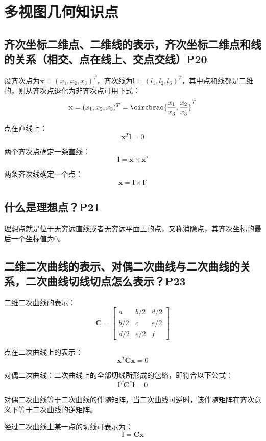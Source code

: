 \documentclass[11pt]{article}
\begin{document}
\section{多视图几何知识点}
\subsection{齐次坐标二维点、二维线的表示，齐次坐标二维点和线的关系（相交、点在线上、交点交线）P20}
设齐次点为$\mathbf{x}=(x_1,x_2,x_3)^T$，齐次线为$\mathbf{l}=(l_1,l_2,l_3)^T$，其中点和线都是二维的，则从齐次点退化为非齐次点可用下式：
\begin{equation*}
  \mathbf{x}=(x_1,x_2,x_3)^T=\circbrac{\frac{x_1}{x_3},\frac{x_2}{x_3}}^T
\end{equation*}\par
点在直线上：
\begin{equation*}
  \mathbf{x}^T\mathbf{l}=0
\end{equation*}\par
两个齐次点确定一条直线：
\begin{equation*}
  \mathbf{l}=\mathbf{x}\times\mathbf{x}'
\end{equation*}\par
两条齐次线确定一个点：
\begin{equation*}
  \mathbf{x}=\mathbf{l}\times\mathbf{l}'
\end{equation*}\par
\subsection{什么是理想点？P21}
理想点就是位于无穷远直线或者无穷远平面上的点，又称消隐点，其齐次坐标的最后一个坐标值为0。
\subsection{二维二次曲线的表示、对偶二次曲线与二次曲线的关系，二次曲线切线切点怎么表示？P23}
二维二次曲线的表示：
\begin{equation*}
  \mathbf{C}=\begin{bmatrix}
    a   & b/2 & d/2 \\
    b/2 & c   & e/2 \\
    d/2 & e/2 & f
  \end{bmatrix}
\end{equation*}\par
点在二次曲线上的表示：
\begin{equation*}
  \mathbf{x}^T\mathbf{C}\mathbf{x}=0
\end{equation*}\par
对偶二次曲线：二次曲线上的全部切线所形成的包络，即符合以下公式：
\begin{equation*}
  \mathbf{l}^T\mathbf{C}^*\mathbf{l}=0
\end{equation*}\par
对偶二次曲线等于二次曲线的伴随矩阵，当二次曲线可逆时，该伴随矩阵在齐次意义下等于二次曲线的逆矩阵。\par
经过二次曲线上某一点的切线可表示为：
\begin{equation*}
  \mathbf{l=Cx}
\end{equation*}
\end{document}
